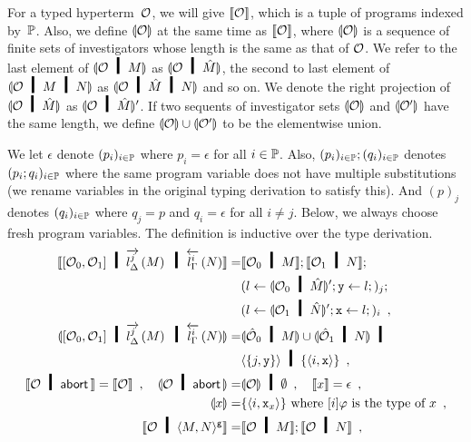 {For a typed
hyperterm~$\mathcal{O}$,
we will give $\llbracket{\mathcal{O}}\rrbracket$, which is a tuple of programs indexed
by~$\mathbb{P}$.
Also, we define $\llparenthesis{\mathcal{O}}\rrparenthesis$ at the same time as
$\llbracket{\mathcal{O}}\rrbracket$, where
$\llparenthesis{\mathcal{O}}\rrparenthesis$ is a sequence of finite sets of investigators whose
length is the same as that of $\mathcal{O}$.
We refer to the last element of $\semoi{\hypert\hmid M}$ as
$\semoi{\hypert\hmid \hat{M}}$, the second to last element of
$\semoi{\hypert\hmid M\hmid N}$ as
$\semoi{\hypert\hmid \hat M\hmid N}$ and so on.
We denote the right projection of $\semoi{\hypert\hmid \hat{M}}$ as
$\semoi{\hypert\hmid \hat{M}}'$.
If two sequents of investigator sets $\llparenthesis{\mathcal{O}}\rrparenthesis$ and $\llparenthesis{\mathcal{O}'}\rrparenthesis$
have the same length, we define $\llparenthesis{\mathcal{O}}\rrparenthesis\cup \llparenthesis{\mathcal{O}'}\rrparenthesis$ to
be the elementwise union.

We let $\epsilon$ denote $(p_i)_{i\in\mathbb{P}}$ where $p_i=\epsilon$
for all $i\in\mathbb{P}$.
Also, $(p_i)_{i\in\mathbb{P}}; (q_i)_{i\in\mathbb{P}}$ denotes
$(p_i; q_i)_{i\in\mathbb{P}}$ where the
same program variable does not have multiple substitutions
(we rename variables in the original typing derivation to satisfy this).
And $(p)_j$ denotes $(q_i)_{i\in\mathbb{P}}$ where $q_j = p$ and $q_i =
\epsilon$ for all $i\neq j$.
Below, we always choose fresh program variables.
The definition is inductive over the type derivation.
{\footnotesize
\begin{align*}
 \semo{\cotuple{\hypert_0,\hypert_1}\hmid \ltor j l \Delta M\hmid \rtol i l\Gamma N}
 =& \semo{\hypert_0\hmid M};
 \semo{\hypert_1\hmid N};\\
 &(l\leftarrow \semoi{\hypert_0\hmid\hat M}'; \p
 y\leftarrow l;)_j; \\
 &(l\leftarrow \semoi{\hypert_1\hmid\hat N}'; \p
 x\leftarrow l;)_i\enspace,\\
 \semoi{\cotuple{\hypert_0,\hypert_1}\hmid\ltor j l \Delta M\hmid \rtol i l\Gamma N} =&
 \semoi{\hat \hypert_0\hmid M} \cup \semoi{\hat \hypert_1\hmid N} \hmid\\& \tuple{\{j,\p
 y\}}\hmid \{\tuple{i,\p x}\}\enspace,\\
 \semo{\hypert\hmid \abort}=\semo{\hypert}\enspace,\quad
 \semoi{\hypert\hmid\abort}=&\semoi{\hypert}\hmid \emptyset\enspace,\quad
 \semo{x}= \epsilon \enspace,\\
 \semoi{x}=& \{\tuple{i,\p x_x}\} \text{ where $[i]\varphi$ is the type
 of $x$}\enspace,\\
 \semo{\hypert\hmid \gpair{M,N}}=&
 \semo{\hypert\hmid M}; \semo{\hypert\hmid N}\enspace,\\

\end{align*}}}
